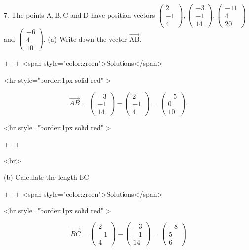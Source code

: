7. The points $\mathrm{A}, \mathrm{B}, \mathrm{C}$ and D have position vectors $\left(\begin{array}{c}2 \\ -1 \\ 4\end{array}\right),\left(\begin{array}{l}-3 \\ -1 \\ 14\end{array}\right),\left(\begin{array}{c}-11 \\ 4 \\ 20\end{array}\right)$ and $\left(\begin{array}{c}-6 \\ 4 \\ 10\end{array}\right)$.
(a) Write down the vector $\overrightarrow{\mathrm{AB}}$.


+++ <span style="color:green">Solutions</span>

<hr style="border:1px solid red" >

$$
\overrightarrow{AB}
= \begin{pmatrix} -3\\ -1\\ 14 \end{pmatrix}
- \begin{pmatrix} 2\\ -1\\ 4 \end{pmatrix}
= \begin{pmatrix} -5\\ 0\\ 10 \end{pmatrix}.
$$

<hr style="border:1px solid red" >

+++

<br>

(b) Calculate the length BC

+++ <span style="color:green">Solutions</span>

<hr style="border:1px solid red" >

$$
\overrightarrow{BC} = \left(\begin{array}{c}2 \\ -1 \\ 4\end{array}\right) - \left(\begin{array}{l}-3 \\ -1 \\ 14\end{array}\right) = \left(\begin{array}{l}-8 \\ 5 \\ 6\end{array}\right)
$$

